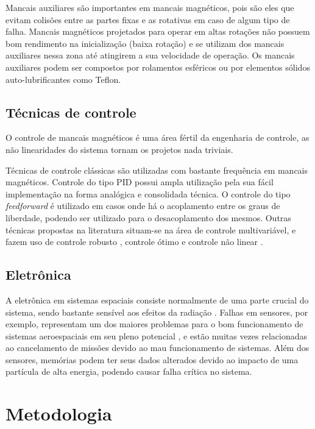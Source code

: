  Mancais auxiliares são importantes em mancais magnéticos, pois são eles que evitam colisões entre as partes fixas e as rotativas em caso de algum tipo de falha. Mancais magnéticos projetados para operar em altas rotações não possuem bom rendimento na inicialização  (baixa rotação) e se utilizam dos mancais auxiliares nessa zona até atingirem a sua velocidade de operação. Os mancais auxiliares podem ser compostos por rolamentos esféricos \citep{Sun2004a} ou por elementos sólidos auto-lubrificantes como Teflon.
 
\subsection{Técnicas de controle}

O controle de mancais magnéticos é uma área fértil da engenharia de controle, as não linearidades do sistema tornam os projetos nada triviais.  

Técnicas de controle clássicas são utilizadas com bastante frequência em mancais magnéticos. Controle do tipo PID \citep{Tezuka2013} possui ampla utilização pela sua fácil implementação na forma analógica e consolidada técnica. O controle  do tipo \textit{feedforward} é utilizado em casos onde há o acoplamento entre os graus de liberdade, podendo ser utilizado para o desacoplamento dos mesmos. Outras técnicas propostas na literatura situam-se na área de controle multivariável, e fazem uso de controle robusto \citep{Jimenez-Lizafrraga2007}, controle ótimo \citep{Schuhmann2012} e controle não linear \citep{Rundell1996}.

\subsection{Eletrônica}

A eletrônica em sistemas espaciais consiste normalmente de uma parte crucial do sistema, sendo bastante sensível aos efeitos da radiação \citep{Stassinopoulos1988}. Falhas em sensores, por exemplo, representam um dos maiores problemas para o bom funcionamento de sistemas aeroespaciais em seu pleno potencial \citep{Balaban2009}, e estão muitas vezes relacionadas ao cancelamento de missões devido ao mau funcionamento de sistemas. Além dos sensores, memórias podem ter seus dados alterados devido ao impacto de uma partícula de alta energia, podendo causar falha crítica no sistema.

\section{Metodologia}


